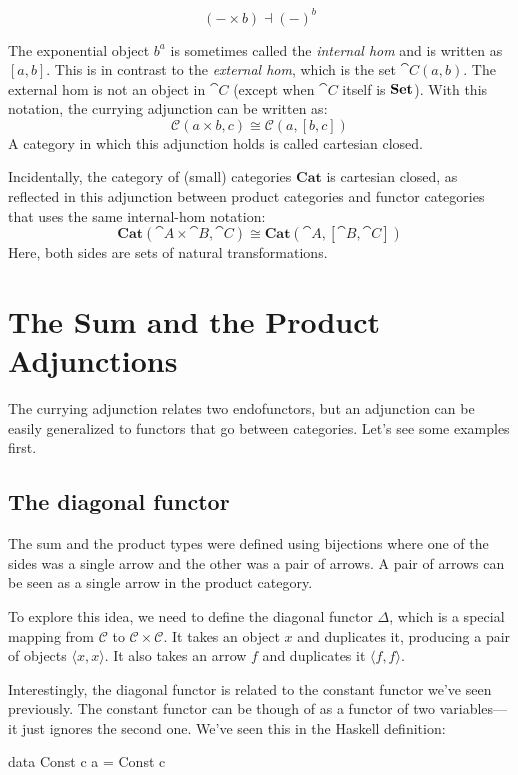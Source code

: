 \documentclass[DaoFP]{subfiles}
\begin{document}
\[ (- \times b) \dashv (-)^b \]

The exponential object $b^a$ is sometimes called the \emph{internal hom} and is written as $[a, b]$. This is in contrast to the \emph{external hom}, which is the set $\cat C (a, b)$. The external hom is not an object in $\cat C$ (except when $\cat C$ itself is $\mathbf{Set}$). With this notation, the currying adjunction can be written as:
\[  \mathcal{C}(a \times b, c ) \cong  \mathcal{C} (a, [b, c])  \]
A category in which this adjunction holds is called cartesian closed.

Incidentally, the category of (small) categories $\mathbf{Cat}$ is cartesian closed, as reflected in this adjunction between product categories and functor categories that uses the same internal-hom notation:
\[ \mathbf{Cat} (\cat A \times \cat B, \cat C) \cong \mathbf{Cat} (\cat A, [\cat B, \cat C]) \]
Here, both sides are sets of natural transformations.


\section{The Sum and the Product Adjunctions}

The currying adjunction relates two endofunctors, but an adjunction can be easily generalized to functors that go between categories. Let's see some examples first.

\subsection{The diagonal functor}

The sum and the product types were defined using bijections where one of the sides was a single arrow and the other was a pair of arrows. A pair of arrows can be seen as a single arrow in the product category. 

To explore this idea, we need to define the diagonal functor $\Delta$, which is a special mapping from $\mathcal{C}$ to $\mathcal{C} \times \mathcal{C}$. It takes an object $x$ and duplicates it, producing a pair of objects $\langle x, x \rangle$. It also takes an arrow $f$ and duplicates it $\langle f, f \rangle$.

Interestingly, the diagonal functor is related to the constant functor we've seen previously. The constant functor can be though of as a functor of two variables---it just ignores the second one. We've seen this in the Haskell definition:
\begin{haskell}
data Const c a = Const c
\end{haskell}
\end{document}
